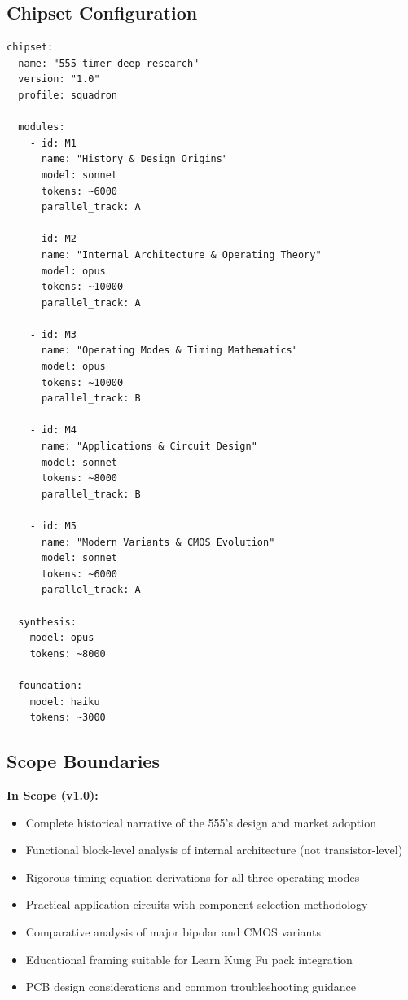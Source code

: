\documentclass[11pt,letterpaper]{article}
\begin{document}
\subsection{Chipset Configuration}

\begin{asciibox}
\begin{verbatim}
chipset:
  name: "555-timer-deep-research"
  version: "1.0"
  profile: squadron

  modules:
    - id: M1
      name: "History & Design Origins"
      model: sonnet
      tokens: ~6000
      parallel_track: A

    - id: M2
      name: "Internal Architecture & Operating Theory"
      model: opus
      tokens: ~10000
      parallel_track: A

    - id: M3
      name: "Operating Modes & Timing Mathematics"
      model: opus
      tokens: ~10000
      parallel_track: B

    - id: M4
      name: "Applications & Circuit Design"
      model: sonnet
      tokens: ~8000
      parallel_track: B

    - id: M5
      name: "Modern Variants & CMOS Evolution"
      model: sonnet
      tokens: ~6000
      parallel_track: A

  synthesis:
    model: opus
    tokens: ~8000

  foundation:
    model: haiku
    tokens: ~3000
\end{verbatim}
\end{asciibox}

\subsection{Scope Boundaries}

\textbf{In Scope (v1.0):}
\begin{itemize}[leftmargin=2em]
  \item Complete historical narrative of the 555's design and market adoption
  \item Functional block-level analysis of internal architecture (not transistor-level)
  \item Rigorous timing equation derivations for all three operating modes
  \item Practical application circuits with component selection methodology
  \item Comparative analysis of major bipolar and CMOS variants
  \item Educational framing suitable for Learn Kung Fu pack integration
  \item PCB design considerations and common troubleshooting guidance
\end{itemize}
\end{document}
